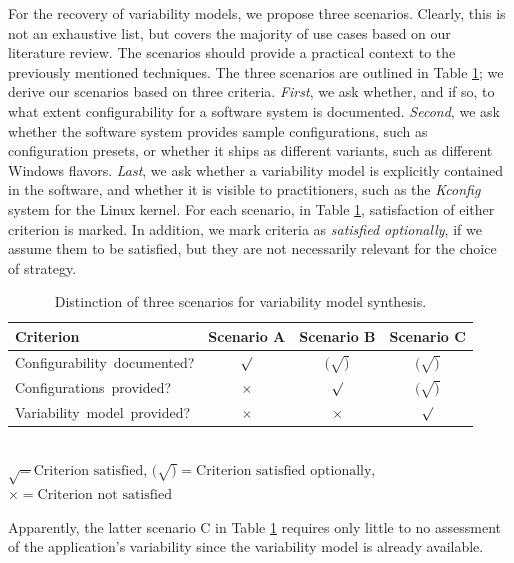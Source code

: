 For the recovery of variability models, we propose three scenarios. Clearly,
this is not an exhaustive list, but covers the majority of use cases based on
our literature review. The scenarios should provide a practical context to the
previously mentioned techniques. The three scenarios are outlined in Table
\ref{tab:synthesis}; we derive our scenarios based on three criteria.
\emph{First}, we ask whether, and if so, to what extent configurability for a
software system is documented. \emph{Second}, we ask whether the software
system provides sample configurations, such as configuration presets, or
whether it ships as different variants, such as different Windows flavors.
\emph{Last}, we ask whether a variability model is explicitly contained in the
software, and whether it is visible to practitioners, such as the \emph{Kconfig}
system for the Linux kernel. For each scenario, in Table \ref{tab:synthesis},
satisfaction of either criterion is marked. In addition, we mark criteria as
\emph{satisfied optionally}, if we assume them to be satisfied, but they are
not necessarily relevant for the choice of strategy.

\begin{table} 
	\centering
	\begin{tabular}{lccc}%
	\toprule
	\textbf{Criterion} & \textbf{Scenario A} & \textbf{Scenario B} &
	\textbf{Scenario C}
	\\
	\midrule
	\mbox{Configurability documented?} & $\surd$ & $(\surd)$ & $(\surd)$ \\
	\mbox{Configurations provided?} & $\times$ & $\surd$ & $(\surd)$ \\
	\mbox{Variability model provided?} & $\times$ & $\times$ & $\surd$ \\
	\bottomrule
	\end{tabular}\\
	\vspace{1mm}
	{\footnotesize $\surd = \text{Criterion satisfied}$, $(\surd) =
	\text{Criterion satisfied optionally}$, $\times = \text{Criterion not
	satisfied}$}
	\caption{Distinction of three scenarios for variability model synthesis. }
	\label{tab:synthesis}
\end{table}

Apparently, the latter scenario C in Table \ref{tab:synthesis} requires only
little to no assessment of the application's variability since the variability
model is already available.


